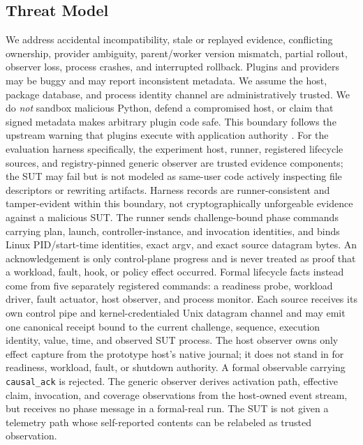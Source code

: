 \documentclass[letterpaper,twocolumn,10pt]{article}
\newcommand{\code}[1]{\texttt{#1}}
\begin{document}
\subsection{Threat Model}
We address accidental incompatibility, stale or replayed evidence, conflicting
ownership, provider ambiguity, parent/worker version mismatch, partial rollout,
observer loss, process crashes, and interrupted rollback.  Plugins and
providers may be buggy and may report inconsistent metadata.  We assume the
host, package database, and process identity channel are administratively
trusted.  We do \emph{not} sandbox malicious Python, defend a compromised host,
or claim that signed metadata makes arbitrary plugin code safe.  This boundary
follows the upstream warning that plugins execute with application authority
\cite{vllm-security}.
For the evaluation harness specifically, the experiment host, runner,
registered lifecycle sources, and registry-pinned generic observer are trusted
evidence components; the SUT may fail but is not modeled as same-user code
actively inspecting file descriptors or rewriting artifacts.  Harness records
are runner-consistent and tamper-evident within this boundary, not
cryptographically unforgeable evidence against a malicious SUT.
The runner sends challenge-bound phase commands carrying plan, launch,
controller-instance, and invocation identities, and binds Linux PID/start-time
identities, exact argv, and exact source datagram bytes.  An acknowledgement is
only control-plane progress and is never treated as proof that a workload,
fault, hook, or policy effect occurred.  Formal lifecycle facts instead come
from five separately registered commands: a readiness probe, workload driver,
fault actuator, host observer, and process monitor.  Each source receives its
own control pipe and kernel-credentialed Unix datagram channel and may emit one
canonical receipt bound to the current challenge, sequence, execution identity,
value, time, and observed SUT process.  The host observer owns only effect
capture from the prototype host's native journal; it does not stand in for
readiness, workload, fault, or shutdown authority.  A formal observable carrying
\code{causal\_ack} is rejected.  The generic observer derives activation path,
effective claim, invocation, and coverage observations from the host-owned
event stream, but receives no phase message in a formal-real run.  The SUT is
not given a telemetry path whose self-reported contents can be relabeled as
trusted observation.
\end{document}
